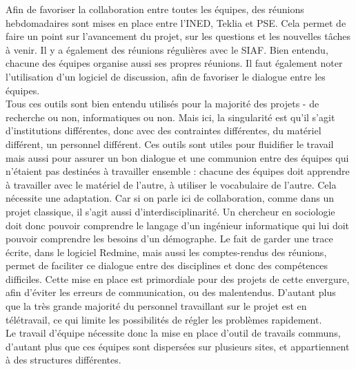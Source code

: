 Afin de favoriser la collaboration entre toutes les équipes, des réunions hebdomadaires sont mises en place entre l’INED, Teklia et PSE. Cela permet de faire un point sur l'avancement du projet, sur les questions et les nouvelles tâches à venir. Il y a également des réunions régulières avec le SIAF. Bien entendu, chacune des équipes organise aussi ses propres réunions. Il faut également noter l’utilisation d'un logiciel de discussion, afin de favoriser le dialogue entre les équipes.\\ 
Tous ces outils sont bien entendu utilisés pour la majorité des projets - de recherche ou non, informatiques ou non. Mais ici, la singularité est qu’il s’agit d’institutions différentes, donc avec des contraintes différentes, du matériel différent, un personnel différent. Ces outils sont utiles pour fluidifier le travail mais aussi pour assurer un bon dialogue et une communion entre des équipes qui n’étaient pas destinées à travailler ensemble : chacune des équipes doit apprendre à travailler avec le matériel de l’autre, à utiliser le vocabulaire de l’autre. Cela nécessite une adaptation. Car si on parle ici de collaboration, comme dans un projet classique, il s’agit aussi d’interdisciplinarité. Un chercheur en sociologie doit donc pouvoir comprendre le langage d’un ingénieur informatique qui lui doit pouvoir comprendre les besoins d’un démographe. Le fait de garder une trace écrite, dans le logiciel Redmine, mais aussi les comptes-rendus des réunions, permet de faciliter ce dialogue entre des disciplines et donc des compétences difficiles. Cette mise en place est primordiale pour des projets de cette envergure, afin d’éviter les erreurs de communication, ou des malentendus. D’autant plus que la très grande majorité du personnel travaillant sur le projet est en télétravail, ce qui limite les possibilités de régler les problèmes rapidement. \\
Le travail d’équipe nécessite donc la mise en place d’outil de travails communs, d’autant plus que ces équipes sont dispersées sur plusieurs sites, et appartiennent à des structures différentes.\\ 

